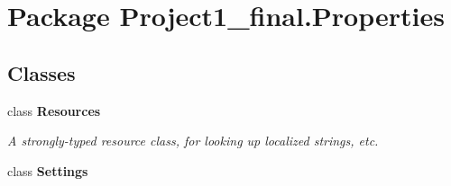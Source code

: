 \hypertarget{namespace_project1__final_1_1_properties}{\section{Package Project1\+\_\+final.\+Properties}
\label{namespace_project1__final_1_1_properties}
}
\subsection*{Classes}
\begin{DoxyCompactItemize}
\item 
class {\bfseries Resources}
\begin{DoxyCompactList}\small\item\em A strongly-\/typed resource class, for looking up localized strings, etc. \end{DoxyCompactList}\item 
class {\bfseries Settings}
\end{DoxyCompactItemize}
